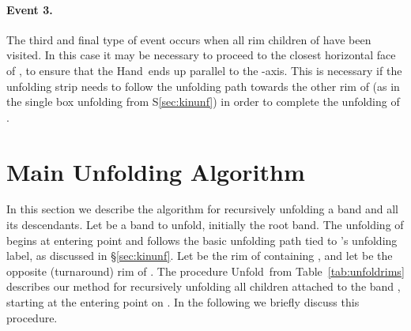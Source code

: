 \documentclass[11pt]{article}
\newcommand\hand{{\sc Hand}}
\newcommand\unfoldrims{{\sc Unfold}}
\begin{document}
\paragraph{Event 3.} The third and final type of event occurs when all rim children of  have been visited. In this case it may be necessary to proceed to the closest horizontal face of , to ensure that the \hand\ ends up parallel to the -axis. This is necessary if the unfolding strip needs to follow the unfolding path towards the other rim of  (as in the single box unfolding from S\ref{sec:kinunf}) in order to complete the unfolding of .



\section{Main Unfolding Algorithm}
\label{sec:alg}
In this section we describe the algorithm for recursively unfolding a band and all its descendants. Let  be a band to unfold, initially the root band. The unfolding of  begins at entering point  and follows the basic unfolding path tied to 's unfolding label, as discussed in \S\ref{sec:kinunf}. Let  be the rim of  containing , and let  be the opposite (turnaround) rim of . The procedure \unfoldrims\ from Table~\ref{tab:unfoldrims} describes our method for recursively unfolding all children attached to the band , starting at the entering point  on . In the following we briefly discuss this procedure.
\end{document}
